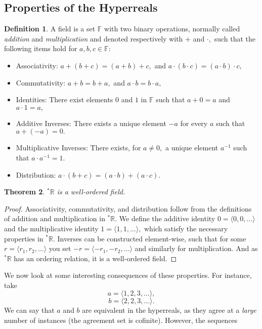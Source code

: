 \documentclass[12pt]{amsart}
\newcommand{\stt}{{}^*}
\newcommand{\FF}{\mathbb{F}}
\newcommand{\RR}{\mathbb{R}}
\theoremstyle{plain}
\newtheorem{thm}{Theorem}
\theoremstyle{definition}
\newtheorem{defn}[thm]{Definition}
\theoremstyle{remark}
\theoremstyle{theorem}
\numberwithin{equation}{section}
\numberwithin{thm}{section}
\begin{document}
\subsection{Properties of the Hyperreals}
\begin{defn}
\label{field}
A field is a set $\FF$ with two binary operations, normally called \textit{addition} and \textit{multiplication} and denoted respectively with $+$ and $\cdot,$ such that the following items hold for $a,b,c \in \FF$:
\begin{itemize}
    \item Associativity: $a + (b+c) = (a+b) + c,$ and $a \cdot (b \cdot c) = (a \cdot b) \cdot c,$
    \item Commutativity: $a + b = b + a,$ and $a \cdot b = b \cdot a,$
    \item Identities: There exist elements $0$ and $1$ in $\FF$ such that $a + 0 = a$ and $a \cdot 1 = a,$
    \item Additive Inverses: There exists a unique element $-a$ for every $a$ such that $a + (-a) = 0.$
    \item Multiplicative Inverses: There exists, for $a \neq 0,$ a unique element $a^{-1}$ such that $a \cdot a^{-1} = 1.$
    \item Distribution: $a \cdot (b+c) = (a\cdot b) + (a \cdot c).$
\end{itemize}
\end{defn}
\begin{thm}
$\stt \RR$ is a well-ordered field. \label{hyperrealfield}
\end{thm}
\begin{proof}
Associativity, commutativity, and distribution follow from the definitions of addition and multiplication in $\stt \RR.$ We define the additive identity $0 = \langle 0, 0, \ldots \rangle$ and the multiplicative identity $1 = \langle 1, 1, \ldots \rangle,$ which satisfy the necessary properties in $\stt \RR.$ Inverses can be constructed element-wise, such that for some $r=\langle r_1, r_2, \ldots \rangle$ you set $-r = \langle -r_1, -r_2, \ldots \rangle$ and similarly for multiplication. And as $\stt \RR$ has an ordering relation, it is a well-ordered field. 
\end{proof}
We now look at some interesting consequences of these properties. For instance, take 
\[a = \langle 1,2,3,\ldots \rangle, \]
\[b = \langle 2,2,3,\ldots \rangle.\]
We can say that $a$ and $b$ are equivalent in the hyperreals, as they agree at a \textit{large} number of instances (the agreement set is cofinite). However, the sequences 
\end{document}
